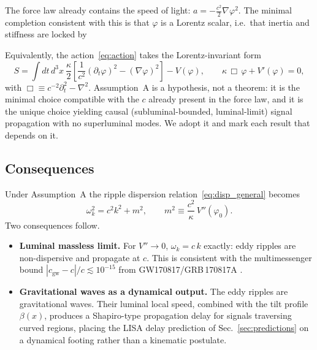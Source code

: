 The force law already contains the speed of light: $a = -\tfrac{c^2}{2}\nabla\varphi^2$.
The minimal completion consistent with this is that $\varphi$ is a Lorentz scalar, i.e.\
that inertia and stiffness are locked by

\begin{center}
\end{center}

\noindent
Equivalently, the action~\eqref{eq:action} takes the Lorentz-invariant form
\begin{equation}
S = \int\! dt\,d^3x\ \frac{\kappa}{2}
\left[\frac{1}{c^2}\left(\partial_t\varphi\right)^2 - \left(\nabla\varphi\right)^2\right]
- V(\varphi),
\qquad
\kappa\,\Box\,\varphi + V'(\varphi) = 0,
\label{eq:covariant}
\end{equation}
with $\Box \equiv c^{-2}\partial_t^2 - \nabla^2$. Assumption~A is a hypothesis, not a
theorem: it is the minimal choice compatible with the $c$ already present in the force
law, and it is the unique choice yielding causal (subluminal-bounded, luminal-limit)
signal propagation with no superluminal modes. We adopt it and mark each result that
depends on it.

\subsection{Consequences}

Under Assumption~A the ripple dispersion relation~\eqref{eq:disp_general} becomes
\begin{equation}
\omega_k^2 = c^2 k^2 + m^2, \qquad m^2 \equiv \frac{c^2}{\kappa}\,V''(\varphi_0).
\label{eq:disp_rel}
\end{equation}
Two consequences follow.
\begin{itemize}
\item \textbf{Luminal massless limit.} For $V''\to 0$, $\omega_k = c\,k$ exactly:
eddy ripples are non-dispersive and propagate at $c$. This is consistent with the
multimessenger bound $|c_\text{gw}-c|/c \lesssim 10^{-15}$ from GW170817/GRB\,170817A
\cite{LIGO2017GW170817}.
\item \textbf{Gravitational waves as a dynamical output.} The eddy ripples are
gravitational waves. Their luminal local speed, combined with the tilt profile
$\beta(x)$, produces a Shapiro-type propagation delay for signals traversing curved
regions, placing the LISA delay prediction of Sec.~\ref{sec:predictions} on a
dynamical footing rather than a kinematic postulate.
\end{itemize}

